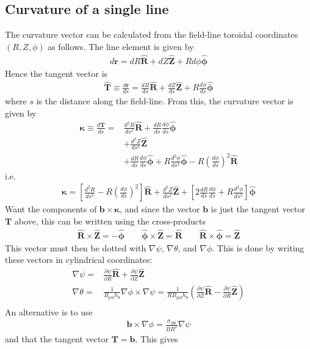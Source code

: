 \documentclass[12pt]{article}
\def\L{\left}
\def\R{\right}
\newcommand{\sbt}{\ensuremath{\sigma_{B\theta}}}
\newcommand{\dd}[2]{\ensuremath{\frac{d #1}{d #2}}}
\newcommand{\ddd}[2]{\ensuremath{\frac{d^2 #1}{d #2^2}}}
\newcommand{\deriv}[2]{\ensuremath{\frac{\partial #1}{\partial #2}}}
\newcommand{\hthe}{\ensuremath{h_\theta}}
\newcommand{\Bp}{\ensuremath{B_{\text{pol}}}}
\newcommand{\ve}[1]{\ensuremath{\boldsymbol{#1}}}
\newcommand{\hv}[1]{\hat{\ve{#1}}}
\newcommand{\bvec}{\ve{b}}
\newcommand{\kvec}{\ve{\kappa}}
\newcommand{\Rvec}{\ensuremath{\hv{R}}}
\newcommand{\Zvec}{\ensuremath{\hv{Z}}}
\newcommand{\phivec}{\ensuremath{\hv{\phi}}}
\begin{document}
\subsection{Curvature of a single line}
%
The curvature vector can be calculated from the field-line toroidal coordinates
$\L(R,Z,\phi\R)$ as follows. The line element is given by
%
\begin{align*}
d\ve{r} = dR\Rvec + dZ\Zvec + Rd\phi\phivec
\end{align*}
%
Hence the tangent vector is
%
\begin{align*}
\hv{T} \equiv \dd{\ve{r}}{s} = \dd{R}{s}\Rvec + \dd{Z}{s}\Zvec +
R\dd{\phi}{s}\phivec
\end{align*}
%
where $s$ is the distance along the field-line. From this, the curvature vector
is given by
%
\begin{align*}
\kvec \equiv \dd{\ve{T}}{s} =& \ddd{R}{s}\Rvec + \dd{R}{s}\dd{\phi}{s}\phivec
    \\ &+ \ddd{Z}{s}\Zvec \\ &+ \dd{R}{s}\dd{\phi}{s}\phivec +
    R\ddd{\phi}{s}\phivec - R\L(\dd{\phi}{s}\R)^2 \Rvec
\end{align*}
%
i.e.
%
\begin{align}
\kvec = \L[\ddd{R}{s} - R\L(\dd{\phi}{s}\R)^2\R]\Rvec +
\ddd{Z}{s}\Zvec + \L[2\dd{R}{s}\dd{\phi}{s} + R\ddd{\phi}{s}\R]\phivec
\label{eq:kappaline}
\end{align}
%
Want the components of $\ve{b}\times\kvec$, and since the vector $\ve{b}$ is
just the tangent vector $\ve{T}$ above, this can be written using the
cross-products
%
\begin{align*}
\Rvec\times\Zvec = -\phivec \qquad \phivec\times\Zvec = \Rvec \qquad
\Rvec\times\phivec = \Zvec
\end{align*}
%
This vector must then be dotted with $\nabla\psi$, $\nabla\theta$, and
$\nabla\phi$. This is done by writing these vectors in cylindrical coordinates:
%
\begin{align*}
\nabla\psi =& \deriv{\psi}{R}\hv{R} + \deriv{\psi}{Z}\hv{Z} \\ \nabla\theta =&
    \frac{1}{\Bp\hthe}\nabla\phi\times\nabla\psi =
    \frac{1}{R\Bp\hthe}\L(\deriv{\psi}{Z}\hv{R} -
    \deriv{\psi}{R}\hv{Z}\R) \\
\end{align*}
%
An alternative is to use
%
\begin{align*}
\bvec \times \nabla\phi = \frac{\sbt}{BR^2}\nabla\psi
\end{align*}
%
and that the tangent vector $\ve{T} = \bvec$. This gives
\end{document}
